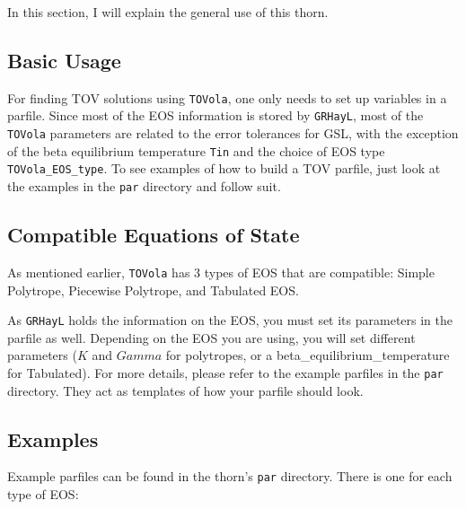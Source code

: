 In this section, I will explain the general use of this thorn. 

\subsection{Basic Usage}

For finding TOV solutions using \texttt{TOVola}, one only needs to set up variables in a parfile. Since most of the EOS information is stored by \texttt{GRHayL}, most of the \texttt{TOVola} parameters are related to the error tolerances for GSL, with the exception of the beta equilibrium temperature \texttt{Tin} and the choice of EOS type \texttt{TOVola\_EOS\_type}. To see examples of how to build a TOV parfile, just look at the examples in the \texttt{par} directory and follow suit.

\subsection{Compatible Equations of State}

As mentioned earlier, \texttt{TOVola} has 3 types of EOS that are compatible: Simple Polytrope, Piecewise Polytrope, and Tabulated EOS.

As \texttt{GRHayL}\cite{TOVola_TOVola_GRHayL} holds the information on the EOS, you must set its parameters in the parfile as well. Depending on the EOS you are using, you will set different parameters ($K$ and $Gamma$ for polytropes, or a beta\_equilibrium\_temperature for Tabulated). For more details, please refer to the example parfiles in the \texttt{par} directory. They act as templates of how your parfile should look.

\subsection{Examples}

Example parfiles can be found in the thorn's \texttt{par} directory. There is one for each type of EOS:

